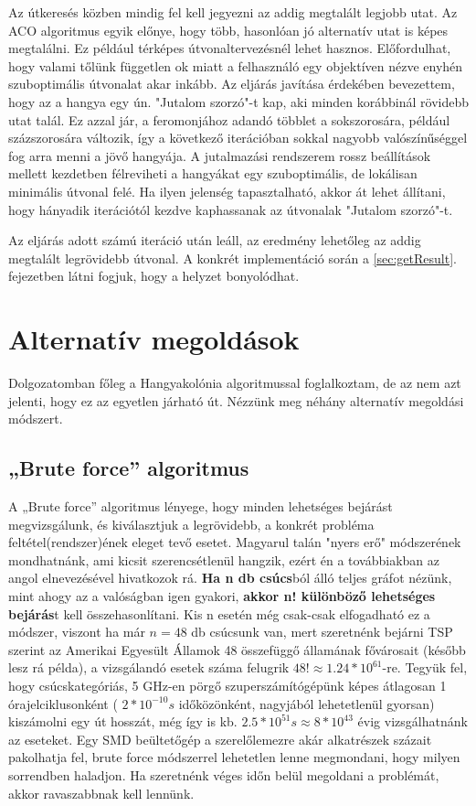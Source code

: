 Az útkeresés közben mindig fel kell jegyezni az addig megtalált legjobb utat. Az ACO algoritmus egyik előnye, hogy több, hasonlóan jó alternatív utat is képes megtalálni. Ez például térképes útvonaltervezésnél lehet hasznos. Előfordulhat, hogy valami tőlünk független ok miatt a felhasználó egy objektíven nézve enyhén szuboptimális útvonalat akar inkább. Az eljárás javítása érdekében bevezettem, hogy az a hangya egy ún. "Jutalom szorzó"-t kap, aki minden korábbinál rövidebb utat talál. Ez azzal jár, a feromonjához adandó többlet a sokszorosára, például százszorosára változik, így a következő iterációban sokkal nagyobb valószínűséggel fog arra menni a jövő hangyája. A jutalmazási rendszerem rossz beállítások mellett kezdetben félreviheti a hangyákat egy szuboptimális, de lokálisan minimális útvonal felé. Ha ilyen jelenség tapasztalható, akkor át lehet állítani, hogy hányadik iterációtól kezdve kaphassanak az útvonalak "Jutalom szorzó"-t.

Az eljárás adott számú iteráció után leáll, az eredmény lehetőleg az addig megtalált legrövidebb útvonal. A konkrét implementáció során a \ref{sec:getResult}. fejezetben látni fogjuk, hogy a helyzet bonyolódhat.

\section{Alternatív megoldások}

Dolgozatomban főleg a Hangyakolónia algoritmussal foglalkoztam, de  az nem azt jelenti, hogy ez az egyetlen járható út. Nézzünk meg néhány alternatív megoldási módszert.

\subsection{„Brute force” algoritmus}
A „Brute force” algoritmus lényege, hogy minden lehetséges bejárást megvizsgálunk, és kiválasztjuk a legrövidebb, a konkrét probléma feltétel(rendszer)ének eleget tevő esetet. Magyarul talán "nyers erő" módszerének mondhatnánk, ami kicsit szerencsétlenül hangzik, ezért én a továbbiakban az angol elnevezésével hivatkozok rá. \textbf{Ha n db csúcs}ból álló teljes gráfot nézünk, mint ahogy az a valóságban igen gyakori, \textbf{akkor n! különböző lehetséges bejárás}t kell összehasonlítani. Kis n esetén még csak-csak elfogadható ez a módszer, viszont ha már \(n=48\) db csúcsunk van, mert szeretnénk bejárni TSP szerint az Amerikai Egyesült Államok 48 összefüggő államának fővárosait (később lesz rá példa), a vizsgálandó esetek száma felugrik \( 48! \approx 1.24 * 10^{61} \)-re. Tegyük fel, hogy csúcskategóriás, 5 GHz-en pörgő szuperszámítógépünk képes átlagosan 1 órajelciklusonként (  \(2*10^{-10}s\) időközönként, nagyjából lehetetlenül gyorsan) kiszámolni egy út hosszát, még így is kb. \(2.5 * 10^{51}s \approx 8 * 10^{43} \) évig vizsgálhatnánk az eseteket. Egy SMD beültetőgép a szerelőlemezre akár alkatrészek százait pakolhatja fel, brute force módszerrel lehetetlen lenne megmondani, hogy milyen sorrendben haladjon. Ha szeretnénk véges időn belül megoldani a problémát, akkor ravaszabbnak kell lennünk.

